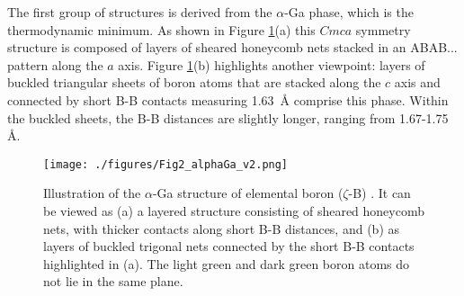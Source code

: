 \documentclass[reprint,aps,prl,twocolumn,letterpaper]{revtex4-2}
\newlength{\figurewidth}
\begin{document}
\begin{table}
     \centering
     \def\arraystretch{1}
     \caption{Enthalpies (meV/atom)  of the ten most stable boron allotropes predicted at 100~GPa with and without zero-point-energy (ZPE) corrections relative to the enthalpy of the $\alpha$-Ga phase. }
\end{table}


The first group of structures is derived from the  $\alpha$-Ga phase, which is the thermodynamic minimum. As shown in Figure \ref{fig:alpha_Ga_structural_figure_v2.png}(a) this $Cmca$ symmetry structure is composed of layers of sheared honeycomb nets stacked in an ABAB... pattern along the $a$ axis.  Figure \ref{fig:alpha_Ga_structural_figure_v2.png}(b) highlights another viewpoint: layers of buckled triangular sheets of boron atoms that are stacked along the $c$ axis and connected by short B-B contacts measuring 1.63~\AA{} comprise this phase. Within the buckled sheets, the B-B distances are slightly longer, ranging from 1.67-1.75 \r{A}.

\begin{figure}
\begin{center}
\texttt{[image: ./figures/Fig2\_alphaGa\_v2.png]}
\end{center}
\caption{Illustration of the $\alpha$-Ga structure of elemental boron ($\zeta$-B) \cite{Chuvashova:2017}. It can be viewed as (a) a layered structure consisting of sheared honeycomb nets, with thicker contacts along short B-B distances, and (b) as layers of buckled trigonal nets connected by the short B-B contacts highlighted in (a). The light green and dark green boron atoms do not lie in the same plane.
\label{fig:alpha_Ga_structural_figure_v2.png}}
\end{figure}
\end{document}
